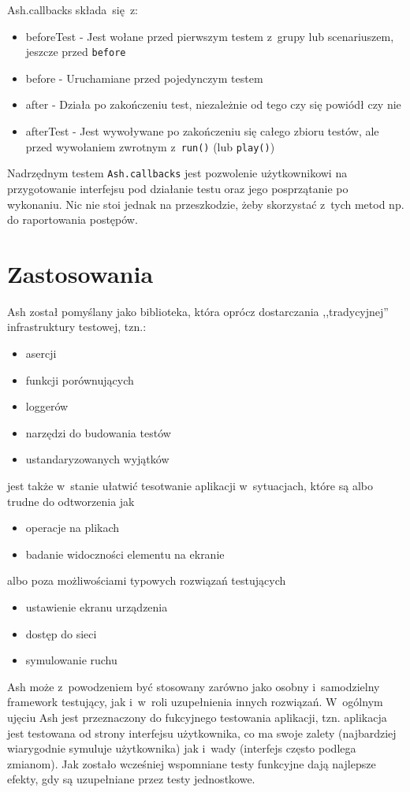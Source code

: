 \documentclass[brudnopis]{xmgr}
\begin{document}
Ash.callbacks składa~się~z:

\begin{itemize}
  \item beforeTest - Jest wołane przed pierwszym testem z~grupy lub scenariuszem, jeszcze przed \texttt{before}
  \item before - Uruchamiane przed pojedynczym testem
  \item after - Działa po zakończeniu test, niezależnie od tego czy się powiódł czy nie
  \item afterTest - Jest wywoływane po zakończeniu się całego zbioru testów, ale przed wywołaniem zwrotnym z~\texttt{run()} (lub \texttt{play()}) 
\end{itemize}

Nadrzędnym testem \texttt{Ash.callbacks} jest pozwolenie użytkownikowi na przygotowanie interfejsu pod działanie testu oraz jego posprzątanie po wykonaniu. Nic nie stoi jednak na przeszkodzie, żeby skorzystać z~tych metod np. do raportowania postępów.

\chapter{Zastosowania}
Ash został pomyślany jako biblioteka, która oprócz dostarczania ,,tradycyjnej'' infrastruktury testowej, tzn.:
\begin{itemize}
  \item asercji
  \item funkcji porównujących
  \item loggerów
  \item narzędzi do budowania testów
  \item ustandaryzowanych wyjątków
\end{itemize}
jest także w~stanie ułatwić tesotwanie aplikacji w~sytuacjach, które są albo trudne do odtworzenia jak
\begin{itemize}
  \item operacje na plikach
  \item badanie widoczności elementu na ekranie
\end{itemize}
 albo poza możliwościami typowych rozwiązań testujących
\begin{itemize}
  \item ustawienie ekranu urządzenia
  \item dostęp do sieci
  \item symulowanie ruchu
\end{itemize}

Ash może z~powodzeniem być stosowany zarówno jako osobny i~samodzielny framework testujący, jak i~w~roli uzupełnienia innych rozwiązań. W~ogólnym ujęciu Ash jest przeznaczony do fukcyjnego testowania aplikacji, tzn. aplikacja jest testowana od strony interfejsu użytkownika, co ma swoje zalety (najbardziej wiarygodnie symuluje użytkownika) jak i~wady (interfejs często podlega zmianom). Jak zostało wcześniej wspomniane testy funkcyjne dają najlepsze efekty, gdy są uzupełniane przez testy jednostkowe.  
\end{document}
